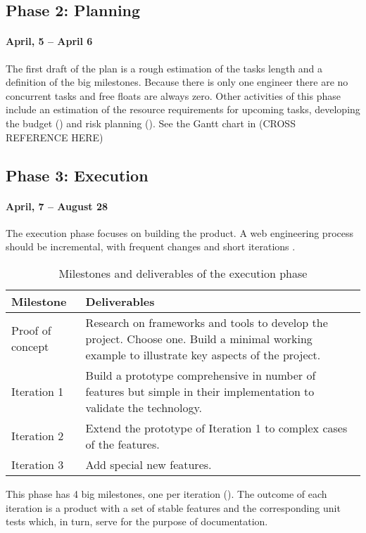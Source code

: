 \subsection{Phase 2: Planning}
\paragraph{April, 5 -- April 6}
The first draft of the plan is a rough estimation of the tasks length and a definition of the big milestones.
Because there is only one engineer there are no concurrent tasks and free floats are always zero.
Other activities of this phase include an estimation of the resource requirements for upcoming tasks, developing the budget () and risk planning ().
See the Gantt chart in (CROSS REFERENCE HERE) 

\subsection{Phase 3: Execution}
\paragraph{April, 7 -- August 28}
The execution phase focuses on building the product. 
A web engineering process should be incremental, with frequent changes and short iterations \cite{Kappel:2006}.

\begin{table}[ht]
    \centering
    \caption{Milestones and deliverables of the execution phase}
    \label{tab:milestones}
    \begin{tabularx}{\linewidth}{| X | X |}
    \hline
    Milestone & Deliverables \\
    \hline
    Proof of concept & Research on frameworks and tools to develop the project. Choose one. Build a minimal working example to illustrate key aspects of the project. \\ \hline
    Iteration 1 & Build a prototype comprehensive in number of features but simple in their implementation to validate the technology. \\ \hline
    Iteration 2 & Extend the prototype of Iteration 1 to complex cases of the features. \\ \hline
    Iteration 3 & Add special new features. \\
    \hline
    \end{tabularx}
\end{table}

This phase has 4 big milestones, one per iteration (). 
The outcome of each iteration is a product with a set of stable features and the corresponding unit tests which, in turn, serve for the purpose of documentation.

